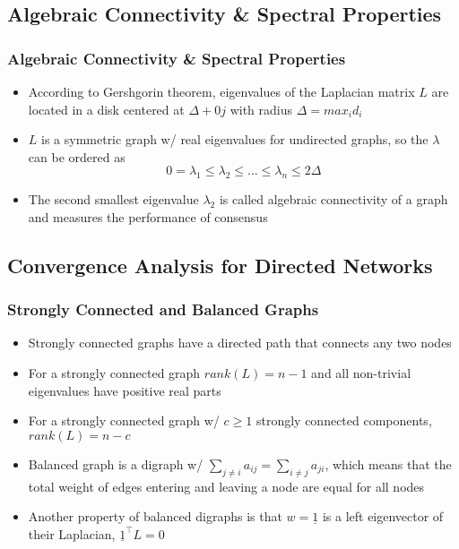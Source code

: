 \documentclass{beamer}
\begin{document}
\subsection{Algebraic Connectivity \& Spectral Properties}

\begin{frame}
\frametitle{Algebraic Connectivity \& Spectral Properties}
\begin{itemize}
\item According to Gershgorin theorem, eigenvalues of the Laplacian matrix $L$ are located in a disk centered at $\Delta + 0j$ with radius $\Delta=max_i d_i$
\item $L$ is a symmetric graph w/ real eigenvalues for undirected graphs, so the $\lambda$ can be ordered as
\begin{equation*}
0=\lambda_1 \leq \lambda_2 \leq ... \leq \lambda_n \leq 2\Delta
\end{equation*}  
\item The second smallest eigenvalue $\lambda_2$ is called algebraic connectivity of a graph and measures the performance of consensus 
\end{itemize}
\end{frame}

\subsection{Convergence Analysis for Directed Networks}

\begin{frame}
\frametitle{Strongly Connected and Balanced Graphs}
\begin{itemize}
\item Strongly connected graphs have a directed path that connects any two nodes
\item For a strongly connected graph $rank(L)=n-1$ and all non-trivial eigenvalues have positive real parts
\item For a strongly connected graph w/ $c\geq 1$ strongly connected components, $rank(L)=n-c$
\item Balanced graph is a digraph w/ $\sum_{j\neq i}a_{ij}=\sum_{i\neq j}a_{ji}$, which means that the total weight of edges entering and leaving a node are equal for all nodes
\item Another property of balanced digraphs is that $w=\underline{1}$ is a left eigenvector of their Laplacian, $\underline{1} ^{\intercal}L=0$
\end{itemize}
\end{frame}
\end{document}
